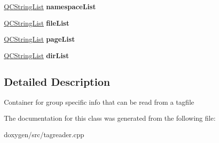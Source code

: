 \begin{DoxyCompactItemize}
\mbox{\hyperlink{class_q_c_string_list}{Q\+C\+String\+List}} {\bfseries namespace\+List}
\item 
\mbox{\label{class_tag_group_info_a65d5606b76278734aca3242dff7353b1}} 
\mbox{\hyperlink{class_q_c_string_list}{Q\+C\+String\+List}} {\bfseries file\+List}
\item 
\mbox{\label{class_tag_group_info_a2209111e0f334ab821af199f531360f4}} 
\mbox{\hyperlink{class_q_c_string_list}{Q\+C\+String\+List}} {\bfseries page\+List}
\item 
\mbox{\label{class_tag_group_info_ac0a5fccca8f7d444c287af47a16e014e}} 
\mbox{\hyperlink{class_q_c_string_list}{Q\+C\+String\+List}} {\bfseries dir\+List}
\end{DoxyCompactItemize}


\subsection{Detailed Description}
Container for group specific info that can be read from a tagfile 

The documentation for this class was generated from the following file\+:\begin{DoxyCompactItemize}
\item 
doxygen/src/tagreader.\+cpp\end{DoxyCompactItemize}
